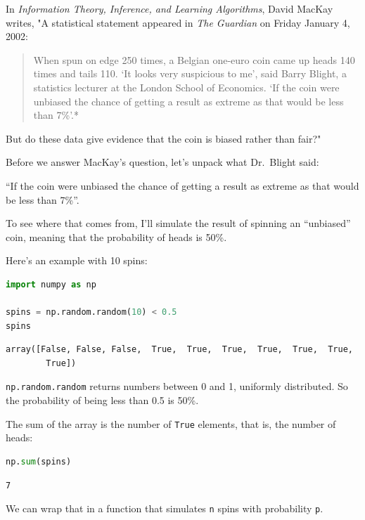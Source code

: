 In \emph{Information Theory, Inference, and Learning Algorithms}, David
MacKay writes, "A statistical statement appeared in \emph{The Guardian}
on Friday January 4, 2002:

\begin{quote}
When spun on edge 250 times, a Belgian one-euro coin came up heads 140
times and tails 110. `It looks very suspicious to me', said Barry
Blight, a statistics lecturer at the London School of Economics. `If the
coin were unbiased the chance of getting a result as extreme as that
would be less than 7\%'.*
\end{quote}

But do these data give evidence that the coin is biased rather than
fair?"

Before we answer MacKay's question, let's unpack what Dr.~Blight said:

``If the coin were unbiased the chance of getting a result as extreme as
that would be less than 7\%''.

To see where that comes from, I'll simulate the result of spinning an
``unbiased'' coin, meaning that the probability of heads is 50\%.

Here's an example with 10 spins:

\begin{lstlisting}[language=Python,style=source]
import numpy as np

spins = np.random.random(10) < 0.5
spins
\end{lstlisting}

\begin{lstlisting}[style=output]
array([False, False, False,  True,  True,  True,  True,  True,  True,
        True])
\end{lstlisting}

\passthrough{\lstinline!np.random.random!} returns numbers between 0 and
1, uniformly distributed. So the probability of being less than 0.5 is
50\%.

The sum of the array is the number of \passthrough{\lstinline!True!}
elements, that is, the number of heads:

\begin{lstlisting}[language=Python,style=source]
np.sum(spins)
\end{lstlisting}

\begin{lstlisting}[style=output]
7
\end{lstlisting}

We can wrap that in a function that simulates
\passthrough{\lstinline!n!} spins with probability
\passthrough{\lstinline!p!}.

